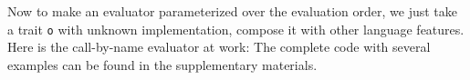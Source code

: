 Now to make an evaluator parameterized over the evaluation order, we just take a
trait \lstinline{o} with unknown implementation, compose it with other language
features.
Here is the call-by-name evaluator at work:
The complete code with several examples can be found in the supplementary
materials.
